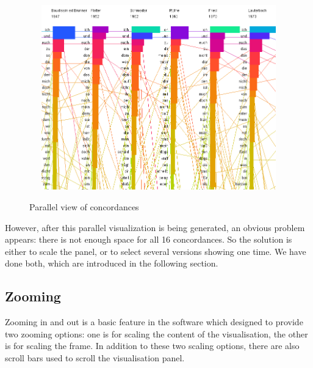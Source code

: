 \begin{figure}[H]
	\centering	
	\includegraphics[width=13cm, height=8cm]{Figs/Parallel-Vis}\\[1ex]
	\caption{Parallel view of concordances}
	\label{fig:parallelConcor}
\end{figure} 


However, after this parallel visualization is being generated, an obvious problem appears: there is not enough space for all 16 concordances. So the solution is either to scale the panel, or to select several versions showing one time. We have done both, which are introduced in the following section. 

\subsection{Zooming}

Zooming in and out is a basic feature in the software which designed to provide two zooming options: one is for scaling the content of the visualisation, the other is for scaling the frame. In addition to these two scaling options, there are also scroll bars used to scroll the visualisation panel.

